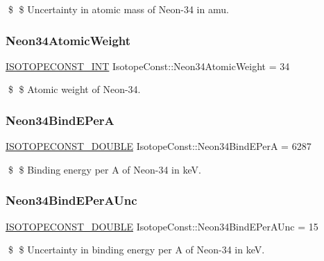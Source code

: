 \$ \$ Uncertainty in atomic mass of Neon-\/34 in amu. \mbox{\label{group___isotope_const-_neon-_ne34_ga08241f833d201826d2c390aba08658cc}} 
\subsubsection{\texorpdfstring{Neon34\+Atomic\+Weight}{Neon34AtomicWeight}}
{\footnotesize\ttfamily \mbox{\hyperlink{group___isotope_const-_macros_ga5f18360b3e99483a35c32d789e62621c}{I\+S\+O\+T\+O\+P\+E\+C\+O\+N\+S\+T\+\_\+\+I\+NT}} Isotope\+Const\+::\+Neon34\+Atomic\+Weight = 34}

\$ \$ Atomic weight of Neon-\/34. \mbox{\label{group___isotope_const-_neon-_ne34_ga53d6d3199a58e57eff0a00dd63ced94e}} 
\subsubsection{\texorpdfstring{Neon34\+Bind\+E\+PerA}{Neon34BindEPerA}}
{\footnotesize\ttfamily \mbox{\hyperlink{group___isotope_const-_macros_ga8f45a7272ce02c0b4c65c44636ed719a}{I\+S\+O\+T\+O\+P\+E\+C\+O\+N\+S\+T\+\_\+\+D\+O\+U\+B\+LE}} Isotope\+Const\+::\+Neon34\+Bind\+E\+PerA = 6287}

\$ \$ Binding energy per A of Neon-\/34 in keV. \mbox{\label{group___isotope_const-_neon-_ne34_ga7c6e5c5a650c4fa6efff3b44f58d46aa}} 
\subsubsection{\texorpdfstring{Neon34\+Bind\+E\+Per\+A\+Unc}{Neon34BindEPerAUnc}}
{\footnotesize\ttfamily \mbox{\hyperlink{group___isotope_const-_macros_ga8f45a7272ce02c0b4c65c44636ed719a}{I\+S\+O\+T\+O\+P\+E\+C\+O\+N\+S\+T\+\_\+\+D\+O\+U\+B\+LE}} Isotope\+Const\+::\+Neon34\+Bind\+E\+Per\+A\+Unc = 15}

\$ \$ Uncertainty in binding energy per A of Neon-\/34 in keV. \mbox{\label{group___isotope_const-_neon-_ne34_gaa95623f0bbd75a6c8d325250054ab232}} 
